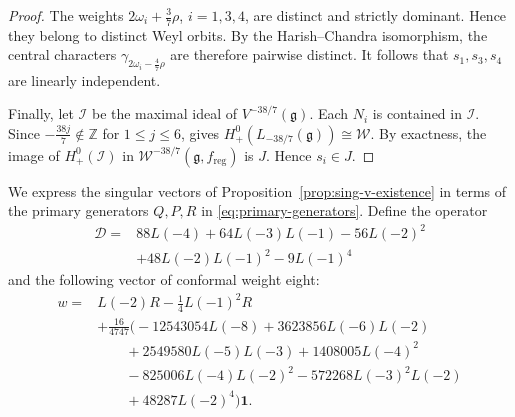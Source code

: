 \documentclass[11pt]{amsart}
\numberwithin{equation}{section}
\theoremstyle{definition}
\theoremstyle{remark}
\newcommand{\g}{\mathfrak g}
\begin{document}
\begin{proof}
		The weights $2\omega_i+\frac37\rho$, $i=1,3,4$, are distinct
and strictly dominant. Hence they belong to distinct Weyl orbits.
By the Harish--Chandra isomorphism, the central characters
$\gamma_{2\omega_i-\frac47\rho}$ are therefore pairwise distinct.
It follows that $s_1,s_3,s_4$ are linearly independent.
	
	Finally, let $\mathcal I$ be the maximal ideal of $V^{-38/7}(\g)$.
	Each $N_i$ is contained in $\mathcal I$.
	Since $-\frac{38j}{7}\notin\mathbb Z$ for $1\le j\le6$, \cite[Corollary 9.1.6(ii)]{Ara07} gives
	$H^0_+(L_{-38/7}(\g))\cong\mathcal W$.
	By exactness, the image of $H^0_+(\mathcal I)$ in $\mathcal W^{-38/7}(\g,f_{\mathrm{reg}})$
	is $J$. Hence $s_i\in J$.
\end{proof}


We express the singular vectors of Proposition~\ref{prop:sing-v-existence}
in terms of the primary generators $Q,P,R$ in \eqref{eq:primary-generators}.
Define the operator
\[
\begin{aligned}
 \mathcal D={}&88L(-4)+64L(-3)L(-1)-56L(-2)^2\\
 &+48L(-2)L(-1)^2-9L(-1)^4
\end{aligned}
\]
and the following vector of conformal weight eight:
\[
\begin{aligned}
 w={}&L(-2)R-\frac14L(-1)^2R\\
 &+\frac{16}{4747}\bigl(
 -12543054L(-8)+3623856L(-6)L(-2)\\
 &\qquad+2549580L(-5)L(-3)+1408005L(-4)^2\\
 &\qquad-825006L(-4)L(-2)^2-572268L(-3)^2L(-2)\\
 &\qquad+48287L(-2)^4\bigr)\mathbf1.
\end{aligned}
\]
\end{document}
